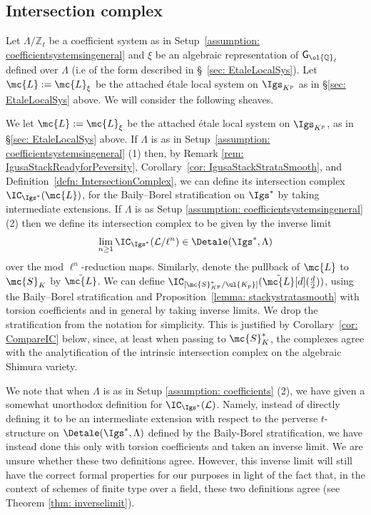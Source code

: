 \documentclass[letterpaper,11pt]{amsart}
\begin{document}
\subsection{Intersection complex}\label{sec: IConIgs}
Let $\Lambda/\mathbb{Z}_\ell$ be a coefficient system as in Setup~\ref{assumption: coefficientsystemsingeneral} and $\xi$ be an algebraic representation of $\mathsf{G}_{\ol{\mathbb{Q}}_{\ell}}$ defined over $\Lambda$ (i.e of the form described in \S~\ref{sec: EtaleLocalSys}). Let $\mc{L}:=\mc{L}_\xi$ be the attached \'etale local system on $\Igs_{K^p}$ as in \S\ref{sec: EtaleLocalSys} above. We will consider the following sheaves.
\begin{definition}{\label{defn: ICIgs*}}
We let $\mc{L}:=\mc{L}_\xi$ be the attached \'etale local system on $\Igs_{K^p}$, as in \S\ref{sec: EtaleLocalSys} above. If $\Lambda$ is as in Setup~\ref{assumption: coefficientsystemsingeneral} (1) then, by Remark \ref{rem: IgusaStackReadyforPeversity}, Corollary~\ref{cor: IgusaStackStrataSmooth}, and Definition~\ref{defn: IntersectionComplex}, we can define its intersection complex $\IC_{\Igs^\ast}(\mc{L})$, for the Baily--Borel stratification on $\Igs^\ast$ by taking intermediate extensions. If $\Lambda$ is as Setup \ref{assumption: coefficientsystemsingeneral} (2) then we define its intersection complex to be given by the inverse limit 
\[ \lim_{n \geq 1} \IC_{\Igs^{*}}(\mathcal{L}/\ell^{n}) \in \Detale(\Igs^{*},\Lambda) \]
over the mod $\ell^{n}$-reduction maps. Similarly, denote the pullback of $\mc{L}$ to $\mc{S}_K$ by $\tilde{\mc{L}}$. We can define $\IC_{[\mc{S}^\ast_{K^p}/\ul{K_p}]}(\tilde{\mc{L}}[d](\tfrac{d}{2}))$, using the Baily--Borel stratification and Proposition~\ref{lemma: stackystratasmooth} with torsion coefficients and in general by taking inverse limits. We drop the stratification from the notation for simplicity. This is justified by Corollary~\ref{cor: CompareIC} below, since, at least when passing to $\mc{S}_{K}^\ast$, the complexes agree with the analytification of the intrinsic intersection complex on the algebraic Shimura variety.
\end{definition}
\begin{remark}{\label{rem: TakingInverseLimitisPresumablyNotNecessary}}
We note that when $\Lambda$ is as in Setup \ref{assumption: coefficients} (2), we have given a somewhat unorthodox definition for $\IC_{\Igs^{\ast}}(\mathcal{L})$. Namely, instead of directly defining it to be an intermediate extension with respect to the perverse $t$-structure on $\Detale(\Igs^{*},\Lambda)$ defined by the Baily-Borel stratification, we have instead done this only with torsion coefficients and taken an inverse limit. We are unsure whether these two definitions agree. However, this inverse limit will still have the correct formal properties for our purposes in light of the fact that, in the context of schemes of finite type over a field, these two definitions agree (see Theorem \ref{thm: inverselimit}). 
\end{remark}
\end{document}
